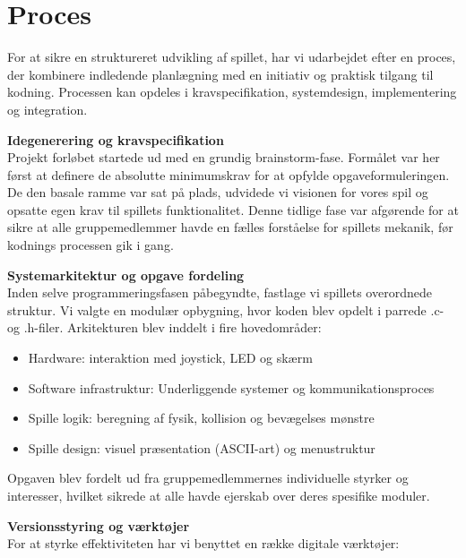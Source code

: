 \chapter{Proces} \label{chap:proces}

For at sikre en struktureret udvikling af spillet, har vi udarbejdet efter en proces, der kombinere indledende planlægning med en initiativ og praktisk tilgang til kodning. Processen kan opdeles i kravspecifikation, systemdesign, implementering og integration. 

\textbf{Idegenerering og kravspecifikation}
\\Projekt forløbet startede ud med en grundig brainstorm-fase. Formålet var her først at definere de absolutte minimumskrav for at opfylde opgaveformuleringen. De den basale ramme var sat på plads, udvidede vi visionen for vores spil og opsatte egen krav til spillets funktionalitet. Denne tidlige fase var afgørende for at sikre at alle gruppemedlemmer havde en fælles forståelse for spillets mekanik, før kodnings processen gik i gang. 

\textbf{Systemarkitektur og opgave fordeling}
\\Inden selve programmeringsfasen påbegyndte, fastlage vi spillets overordnede struktur. Vi valgte en modulær opbygning, hvor koden blev opdelt i parrede .c- og .h-filer. Arkitekturen blev inddelt i fire hovedområder:

\vspace{-5pt}
\begin{itemize}
    \setlength{\itemsep}{0pt}
    \setlength{\parskip}{1pt}
    \setlength{\parsep}{0pt}
    \item Hardware: interaktion med joystick, LED og skærm
    \item Software infrastruktur: Underliggende systemer og kommunikationsproces
    \item Spille logik: beregning af fysik, kollision og bevægelses mønstre
    \item Spille design: visuel præsentation (ASCII-art) og menustruktur
\end{itemize}
\vspace{-5pt}

Opgaven blev fordelt ud fra gruppemedlemmernes individuelle styrker og interesser, hvilket sikrede at alle havde ejerskab over deres spesifike moduler. 

\textbf{Versionsstyring og værktøjer}
\\For at styrke effektiviteten har vi benyttet en række digitale værktøjer: 

